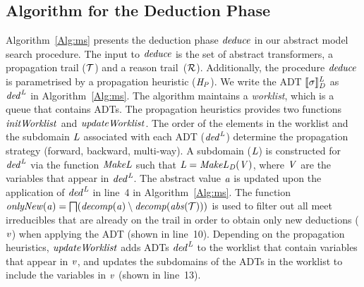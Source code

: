 \subsection{Algorithm for the Deduction Phase}
%
Algorithm~\ref{Alg:ms} presents the deduction phase $\mathit{deduce}$ in 
our abstract model search procedure.  The input to $\mathit{deduce}$ is 
the set of abstract transformers, a propagation trail ($\mathcal{T}$) 
and a reason trail~($\mathcal{R}$).  Additionally, the procedure 
$\mathit{deduce}$ is parametrised by a propagation heuristic ($\mathit{H_P}$). 
We write the ADT 
$\llbracket \sigma \rrbracket_{\mathit{D}}^{\mathit{L}}$
as $\mathit{ded}^{\mathit{L}}$ in Algorithm~\ref{Alg:ms}. 
%
The algorithm maintains a {\em worklist}, which is a queue that contains 
ADTs.  The propagation heuristics provides two 
functions $\mathit{initWorklist}$ and $\mathit{updateWorklist}$.
The order of the elements in the worklist and the subdomain $\mathit{L}$ 
associated with each ADT ($\mathit{ded}^{\mathit{L}}$) 
determine the propagation strategy (forward, backward, multi-way).
A subdomain ($\mathit{L}$) is constructed for $\mathit{ded}^{\mathit{L}}$ 
via the function $\mathit{MakeL}$ such that 
$\mathit{L}=\mathit{MakeL}_{\mathit{D}}(\mathit{V})$, where $\mathit{V}$ are 
the variables that appear in $\mathit{ded}^{\mathit{L}}$. 
%
The abstract value $\mathit{a}$ is updated upon the application of 
$\mathit{ded}^{\mathit{L}}$ in line~4 in Algorithm~\ref{Alg:ms}. 
The function
$\mathit{onlyNew}(\mathit{a})=\bigsqcap({\mathit{decomp}}(\mathit{a})\setminus{\mathit{decomp}}(\mathit{abs}(\mathcal{T})))$
is used to filter out all meet irreducibles that are already on the trail
in order to obtain only new deductions ($\mathit{v}$) when applying 
the ADT (shown in line~10).
%
Depending on the propagation heuristics, $\mathit{updateWorklist}$ adds
ADTs $\mathit{ded}^{\mathit{L}}$ to the 
worklist that contain variables that appear in $\mathit{v}$, and 
updates the subdomains of the ADTs in the worklist 
to include the variables in $\mathit{v}$ (shown in line~13).
%
%

